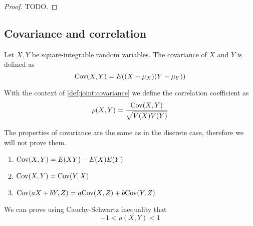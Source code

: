 \documentclass[12pt]{extarticle}
\newcommand{\cov}{{\operatorfont Cov}}
\begin{document}
\begin{proof}
    TODO.
\end{proof}

\subsection{Covariance and correlation}

\begin{definition}[covariance]
    \label{def:joint:covariance}
    Let $X, Y$ be square-integrable random variables.
    The covariance of $X$ and $Y$ is defined as
    \begin{equation}
        \cov(X, Y) = E((X - \mu_X)(Y - \mu_Y))
    \end{equation}
\end{definition}

\begin{definition}
    With the context of \autoref{def:joint:covariance} we define the correlation coefficient as
    \begin{equation}
        \rho(X, Y) = \frac{\cov (X, Y)}{\sqrt{V(X)V(Y)}}
    \end{equation}
\end{definition}


\begin{proposition}
    \label{prop:joint:properties_covariance}

    The properties of covariance are the same as in the discrete case, therefore we will not prove them.

    \begin{enumerate}
        \item $\cov(X, Y) = E(XY) - E(X)E(Y)$
        \item $\cov(X,Y) = \cov(Y,X)$
        \item $\cov(aX + bY, Z) = a \cov(X, Z) + b \cov(Y, Z)$
    \end{enumerate}
\end{proposition}

\begin{proposition}
    We can prove using Cauchy-Schwartz inequality that
    \begin{equation}
        -1 < \rho(X, Y) < 1
    \end{equation}
\end{proposition}

\end{document}
